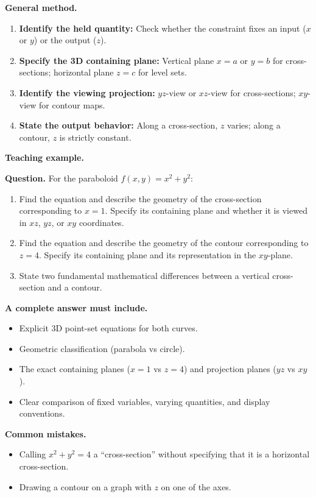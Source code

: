 \documentclass[11pt,letterpaper]{article}
\begin{document}
\textbf{General method.}
\begin{enumerate}[leftmargin=*,nosep]
    \item \textbf{Identify the held quantity:} Check whether the constraint fixes an input ($x$ or $y$) or the output ($z$).
    \item \textbf{Specify the 3D containing plane:} Vertical plane $x=a$ or $y=b$ for cross-sections; horizontal plane $z=c$ for level sets.
    \item \textbf{Identify the viewing projection:} $yz$-view or $xz$-view for cross-sections; $xy$-view for contour maps.
    \item \textbf{State the output behavior:} Along a cross-section, $z$ varies; along a contour, $z$ is strictly constant.
\end{enumerate}

\textbf{Teaching example.}

\textbf{Question.} 
For the paraboloid $f(x,y) = x^2 + y^2$:
\begin{enumerate}[label=(\alph*),nosep]
    \item Find the equation and describe the geometry of the cross-section corresponding to $x = 1$. Specify its containing plane and whether it is viewed in $xz$, $yz$, or $xy$ coordinates.
    \item Find the equation and describe the geometry of the contour corresponding to $z = 4$. Specify its containing plane and its representation in the $xy$-plane.
    \item State two fundamental mathematical differences between a vertical cross-section and a contour.
\end{enumerate}

\textbf{A complete answer must include.}
\begin{itemize}[leftmargin=*,nosep]
    \item Explicit 3D point-set equations for both curves.
    \item Geometric classification (parabola vs circle).
    \item The exact containing planes ($x=1$ vs $z=4$) and projection planes ($yz$ vs $xy$).
    \item Clear comparison of fixed variables, varying quantities, and display conventions.
\end{itemize}

\textbf{Common mistakes.}
\begin{itemize}[leftmargin=*,nosep]
    \item Calling $x^2+y^2=4$ a ``cross-section'' without specifying that it is a horizontal cross-section.
    \item Drawing a contour on a graph with $z$ on one of the axes.
\end{itemize}
\end{document}
